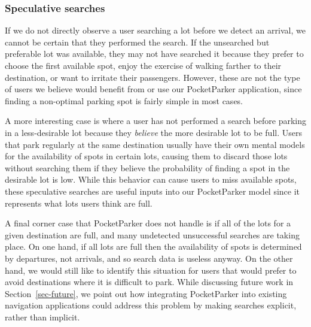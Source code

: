 \subsubsection{Speculative searches}

If we do not directly observe a user searching a lot before we detect an
arrival, we cannot be certain that they performed the search. If the
unsearched but preferable lot was available, they may not have searched it
because they prefer to choose the first available spot, enjoy the exercise of
walking farther to their destination, or want to irritate their passengers.
However, these are not the type of users we believe would benefit from or use
our PocketParker application, since finding a non-optimal parking spot is
fairly simple in most cases.

A more interesting case is where a user has not performed a search before
parking in a less-desirable lot because they \textit{believe} the more
desirable lot to be full. Users that park regularly at the same destination
usually have their own mental models for the availability of spots in certain
lots, causing them to discard those lots without searching them if they
believe the probability of finding a spot in the desirable lot is low. While
this behavior can cause users to miss available spots, these speculative
searches are useful inputs into our PocketParker model since it represents
what lots users think are full.

A final corner case that PocketParker does not handle is if all of the lots
for a given destination are full, and many undetected unsuccessful searches
are taking place. On one hand, if all lots are full then the availability of
spots is determined by departures, not arrivals, and so search data is
useless anyway. On the other hand, we would still like to identify this
situation for users that would prefer to avoid destinations where it is
difficult to park. While discussing future work in Section~\ref{sec-future},
we point out how integrating PocketParker into existing navigation
applications could address this problem by making searches explicit, rather
than implicit.

